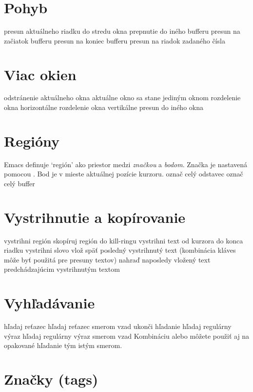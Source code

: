 \section{Pohyb}

 presun aktuálneho riadku do stredu okna
 prepnutie do iného bufferu
 presun na začiatok bufferu
 presun na koniec bufferu
 presun na riadok zadaného čísla

\section{Viac okien}

 odstránenie aktuálneho okna
 aktuálne okno sa stane jediným oknom
 rozdelenie okna horizontálne
 rozdelenie okna vertikálne
 presun do iného okna

\section{Regióny}

Emacs definuje `región' ako priestor medzi {\it značkou\/} a
{\it bodom}. Značka je nastavená pomocou .
Bod je v mieste aktuálnej pozície kurzoru.
\askip
{} označ celý odstavec
 označ celý buffer

\section{Vystrihnutie a kopírovanie}

 vystrihni región
 skopíruj región do kill-ringu
 vystrihni text od kurzora do konca riadku
 vystrihni slovo
 vlož späť posledný vystrihnutý text (kombinácia kláves 
          môže byť použitá pre presuny textov)
 nahraď naposledy vložený text predchádzajúcim vystrihnutým textom

\section{Vyhľadávanie}

 hľadaj reťazec
 hľadaj reťazec smerom vzad
 ukonči hľadanie
 hľadaj regulárny výraz
 hľadaj regulárny výraz smerom vzad
\askip
Kombináciu  alebo  môžete použiť aj na opakované hľadanie
tým istým smerom.

\section{Značky (tags)}

